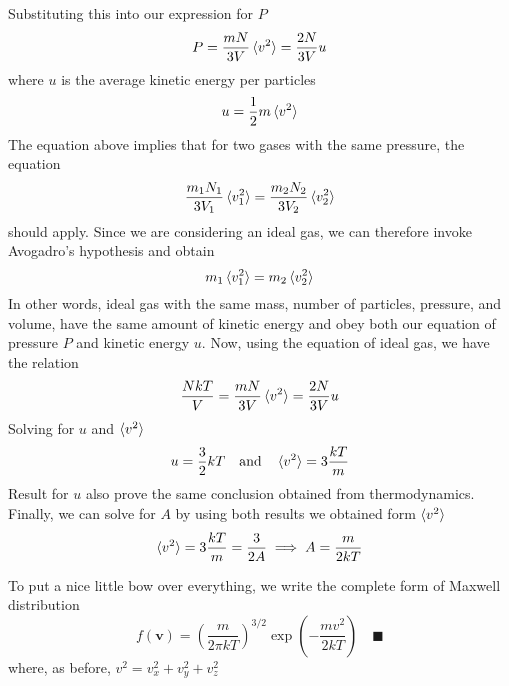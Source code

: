\documentclass[../../../Main.tex]{subfiles}
\begin{document}
Substituting this into our expression for $P$
\begin{equation*}
    P=\frac{mN}{3V}\braket{v^2}=\frac{2N}{3V}u
\end{equation*}
where $u$ is the average kinetic energy per particles
\begin{equation*}
    u=\frac{1}{2}m\braket{v^2}
\end{equation*}
The equation above implies that for two gases with the same pressure, the equation
\begin{equation*}
    \frac{m_1N_1}{3V_1}\braket{v_1^2}=\frac{m_2 N_2}{3V_2}\braket{v_2^2}
\end{equation*}
should apply. Since we are considering an ideal gas, we can therefore invoke Avogadro's hypothesis and obtain
\begin{equation*}
    m_1\braket{v_1^2}=m_2\braket{v_2^2}
\end{equation*}
In other words, ideal gas with the same mass, number of particles, pressure, and volume, have the same amount of kinetic energy and obey both our equation of pressure $P$ and kinetic energy $u$. Now, using the equation of ideal gas, we have the relation
\begin{equation*}
    \frac{NkT}{V}=\frac{mN}{3V}\braket{v^2}=\frac{2N}{3V}u
\end{equation*}
Solving for $u$ and $\braket{v^2}$
\begin{equation*}
    u=\frac{3}{2}kT\quad \text{and} \quad\braket{v^2}=3 \frac{kT}{m}
\end{equation*}
Result for $u$ also prove the same conclusion obtained from thermodynamics. Finally, we can solve for $A$ by using both results we obtained form $\braket{v^2}$
\begin{equation*}
    \braket{v^2}=3 \frac{kT}{m}=\frac{3}{2A} \implies A=\frac{m}{2kT}
\end{equation*}

To put a nice little bow over everything, we write the complete form of Maxwell distribution
\begin{equation*}
    f(\mathbf{v})=\left(\frac{m}{2\pi k T}\right)^{3/2}\exp\left(-\frac{mv^2}{2k T}\right) \quad\blacksquare
\end{equation*}
where, as before, $v^2=v_x^2+v_y^2+v_z^2$
\end{document}
